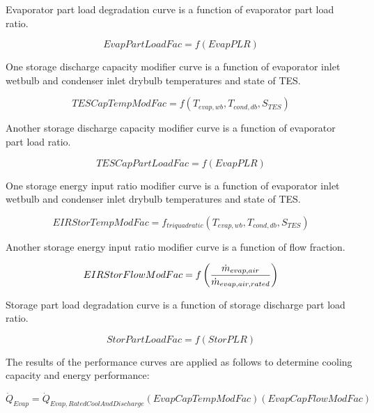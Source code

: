 Evaporator part load degradation curve is a function of evaporator part load ratio.

\begin{equation}
EvapPartLoadFac = f\left( {EvapPLR} \right)
\end{equation}

One storage discharge capacity modifier curve is a function of evaporator inlet wetbulb and condenser inlet drybulb temperatures and state of TES.

\begin{equation}
TESCapTempModFac = f\left( {{T_{evap,wb}},{T_{cond,db}},{S_{TES}}} \right)
\end{equation}

Another storage discharge capacity modifier curve is a function of evaporator part load ratio.

\begin{equation}
TESCapPartLoadFac = f\left( {EvapPLR} \right)
\end{equation}

One storage energy input ratio modifier curve is a function of evaporator inlet wetbulb and condenser inlet drybulb temperatures and state of TES.

\begin{equation}
EIRStorTempModFac = {f_{triquadratic}}\left( {{T_{evap,wb}},{T_{cond,db}},{S_{TES}}} \right)
\end{equation}

Another storage energy input ratio modifier curve is a function of flow fraction.

\begin{equation}
  EIRStorFlowModFac = f\left(\frac{\dot{m}_{evap,air}}{\dot{m}_{evap,air,rated}}\right)
\end{equation}

Storage part load degradation curve is a function of storage discharge part load ratio.

\begin{equation}
StorPartLoadFac = f\left( {StorPLR} \right)
\end{equation}

The results of the performance curves are applied as follows to determine cooling capacity and energy performance:

\begin{equation}
{\dot Q_{Evap}} = {\dot Q_{Evap,RatedCoolAndDischarge}}\left( {EvapCapTempModFac} \right)\left( {EvapCapFlowModFac} \right)
\end{equation}

